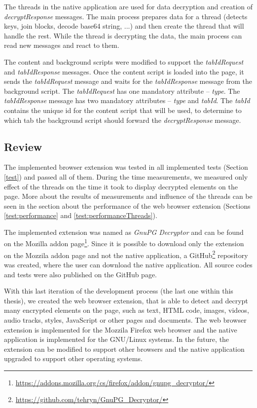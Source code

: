 The threads in the native application are used for data decryption and creation of \textit{decryptResponse} messages. The main process prepares data for a thread (detects keys, join blocks, decode base64 string, ...) and then create the thread that will handle the rest. While the thread is decrypting the data, the main process can read new messages and react to them.

The content and background scripts were modified to support the \textit{tabIdRequest} and \textit{tabIdResponse} messages. Once the content script is loaded into the page, it sends the \textit{tabIdRequest} message and waits for the \textit{tabIdResponse} message from the background script. The \textit{tabIdRequest} has one mandatory attribute -- \textit{type}. The \textit{tabIdResponse} message has two mandatory attributes -- \textit{type} and \textit{tabId}. The \textit{tabId} contains the unique id for the content script that will be used, to determine to which tab the background script should forward the \textit{decryptResponse} message.

\subsection{Review}
The implemented browser extension was tested in all implemented tests (Section \ref{test}) and passed all of them. During the time measurements, we measured only effect of the threads on the time it took to display decrypted elements on the page. More about the results of measurements and influence of the threads can be seen in the section about the performance of the web browser extension (Sections \ref{test:performance} and \ref{test:performanceThreads}).

The implemented extension was named as \textit{GnuPG Decryptor} and can be found on the Mozilla addon page\footnote{\url{https://addons.mozilla.org/cs/firefox/addon/gnupg\_decryptor/}}. Since it is possible to download only the extension on the Mozzila addon page and not the native application, a GitHub\footnote{\url{https://github.com/tehryn/GnuPG\_Decryptor/}} repository was created, where the user can download the native application. All source codes and tests were also published on the GitHub page.

With this last iteration of the development process (the last one within this thesis), we created the web browser extension, that is able to detect and decrypt many encrypted elements on the page, such as text, HTML code, images, videos, audio tracks, styles, JavaScript or other pages and documents. The web browser extension is implemented for the Mozzila Firefox web browser and the native application is implemented for the GNU/Linux systems. In the future, the extension can be modified to support other browsers and the native application upgraded to support other operating systems.

